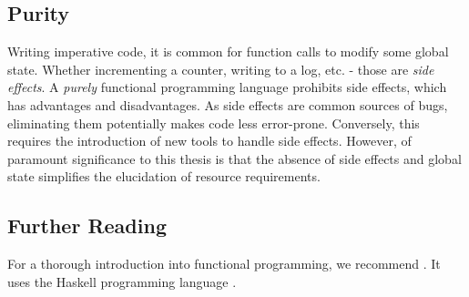 
\subsection{Purity}

Writing imperative code, it is common for function calls to modify some global state. Whether incrementing a counter, writing to a log, etc. - those are \emph{side effects}. A \emph{purely} functional programming language prohibits side effects, which has advantages and disadvantages. As side effects are common sources of bugs, eliminating them potentially makes code less error-prone. Conversely, this requires the introduction of new tools to handle side effects. However, of paramount significance to this thesis is that the absence of side effects and global state simplifies the elucidation of resource requirements. 

\subsection{Further Reading}

For a thorough introduction into functional programming, we recommend \cite{allenHaskellProgrammingFirst2016}. It uses the Haskell programming language \cite{HaskellLanguage}.
